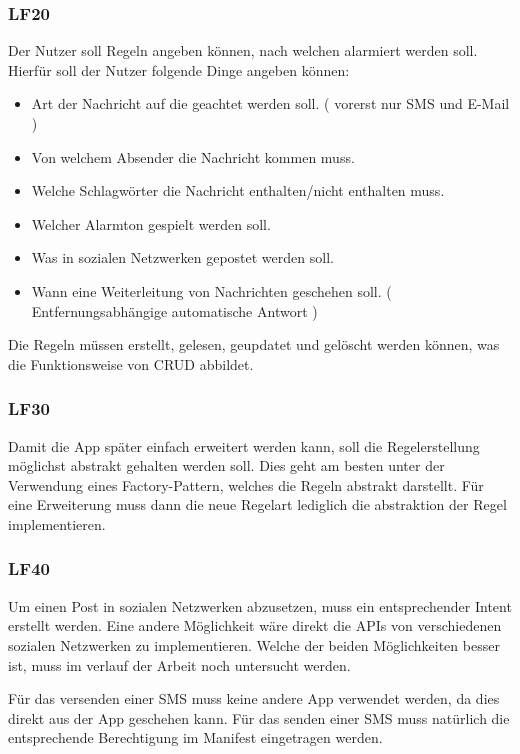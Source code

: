 \subsubsection{LF20}
Der Nutzer soll Regeln angeben k\"onnen, nach welchen alarmiert werden soll. Hierf\"ur soll der Nutzer folgende Dinge angeben k\"onnen:
\begin{itemize}
 \item Art der Nachricht auf die geachtet werden soll. ( vorerst nur SMS und E-Mail )
 \item Von welchem Absender die Nachricht kommen muss.
 \item Welche Schlagw\"orter die Nachricht enthalten/nicht enthalten muss.
 \item Welcher Alarmton gespielt werden soll.
 \item Was in sozialen Netzwerken gepostet werden soll.
 \item Wann eine Weiterleitung von Nachrichten geschehen soll. ( Entfernungsabh\"angige automatische Antwort )
\end{itemize}

Die Regeln m\"ussen erstellt, gelesen, geupdatet und gel\"oscht werden k\"onnen, was die Funktionsweise von CRUD abbildet.

\subsubsection{LF30}
Damit die App sp\"ater einfach erweitert werden kann, soll die Regelerstellung m\"oglichst abstrakt gehalten werden soll. Dies geht am besten unter der Verwendung eines Factory-Pattern, welches die Regeln abstrakt darstellt. F\"ur eine Erweiterung muss dann die neue Regelart lediglich die abstraktion der Regel implementieren. 

\subsubsection{LF40}
Um einen Post in sozialen Netzwerken abzusetzen, muss ein entsprechender Intent erstellt werden. Eine andere M\"oglichkeit w\"are direkt die APIs von verschiedenen sozialen Netzwerken zu implementieren. Welche der beiden M\"oglichkeiten besser ist, muss im verlauf der Arbeit noch untersucht werden.

F\"ur das versenden einer SMS muss keine andere App verwendet werden, da dies direkt aus der App geschehen kann. F\"ur das senden einer SMS muss nat\"urlich die entsprechende Berechtigung im Manifest eingetragen werden.

